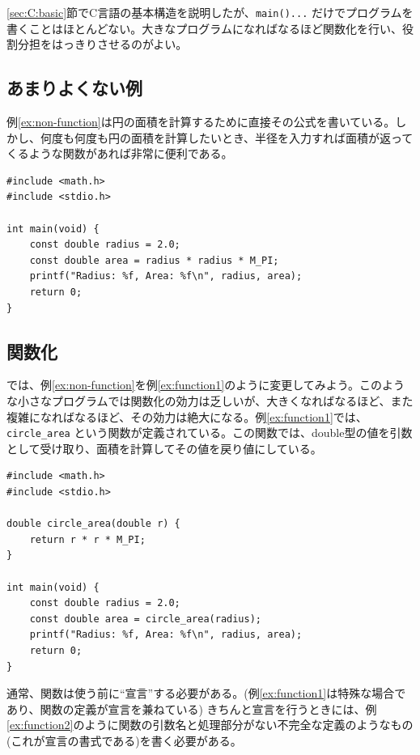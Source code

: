 \ref{sec:C:basic}節でC言語の基本構造を説明したが、\texttt{main(){...}} だけでプログラムを書くことはほとんどない。大きなプログラムになればなるほど関数化を行い、役割分担をはっきりさせるのがよい。

\subsection{あまりよくない例}
例\ref{ex:non-function}は円の面積を計算するために直接その公式を書いている。しかし、何度も何度も円の面積を計算したいとき、半径を入力すれば面積が返ってくるような関数があれば非常に便利である。
\begin{reidai}\label{ex:non-function}
    \begin{verbatim}
#include <math.h>
#include <stdio.h>

int main(void) {
    const double radius = 2.0;
    const double area = radius * radius * M_PI;
    printf("Radius: %f, Area: %f\n", radius, area);
    return 0;
}
\end{verbatim}
\end{reidai}

\subsection{関数化}
では、例\ref{ex:non-function}を例\ref{ex:function1}のように変更してみよう。このような小さなプログラムでは関数化の効力は乏しいが、大きくなればなるほど、また複雑になればなるほど、その効力は絶大になる。例\ref{ex:function1}では、\texttt{circle\_area} という関数が定義されている。この関数では、double型の値を引数として受け取り、面積を計算してその値を戻り値にしている。

\begin{reidai}\label{ex:function1}
    \begin{verbatim}
#include <math.h>
#include <stdio.h>

double circle_area(double r) {
    return r * r * M_PI;
}

int main(void) {
    const double radius = 2.0;
    const double area = circle_area(radius);
    printf("Radius: %f, Area: %f\n", radius, area);
    return 0;
}
\end{verbatim}
\end{reidai}

通常、関数は使う前に``宣言''する必要がある。(例\ref{ex:function1}は特殊な場合であり、関数の定義が宣言を兼ねている)
きちんと宣言を行うときには、例\ref{ex:function2}のように関数の引数名と処理部分がない不完全な定義のようなもの(これが宣言の書式である)を書く必要がある。

